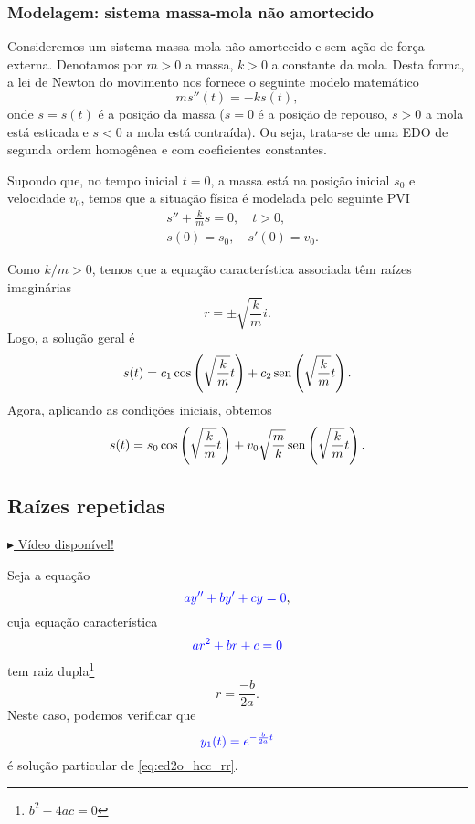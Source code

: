 \subsubsection{Modelagem: sistema massa-mola não amortecido}

Consideremos um sistema massa-mola não amortecido e sem ação de força externa. Denotamos por $m>0$ a massa, $k>0$ a constante da mola. Desta forma, a lei de Newton do movimento nos fornece o seguinte modelo matemático
\begin{equation}
  ms''(t) = -ks(t),
\end{equation}
onde $s = s(t)$ é a posição da massa ($s=0$ é a posição de repouso, $s>0$ a mola está esticada e $s<0$ a mola está contraída). Ou seja, trata-se de uma EDO de segunda ordem homogênea e com coeficientes constantes.

Supondo que, no tempo inicial $t=0$, a massa está na posição inicial $s_0$ e velocidade $v_0$, temos que a situação física é modelada pelo seguinte PVI
\begin{align}
  & s'' + \frac{k}{m}s = 0,\quad t>0,\\
  & s(0) = s_0,\quad s'(0) = v_0.
\end{align}

Como $k/m>0$, temos que a equação característica associada têm raízes imaginárias
\begin{equation}
  r = \pm \sqrt{\frac{k}{m}}i.
\end{equation}
Logo, a solução geral é
\begin{equation}
  s(t) = c_1\cos\left(\sqrt{\frac{k}{m}}t\right) + c_2\operatorname{sen}\left(\sqrt{\frac{k}{m}}t\right).
\end{equation}
Agora, aplicando as condições iniciais, obtemos
\begin{equation}
  s(t) = s_0\cos\left(\sqrt{\frac{k}{m}}t\right) + v_0\sqrt{\frac{m}{k}}\operatorname{sen}\left(\sqrt{\frac{k}{m}}t\right).
\end{equation}

\subsection{Raízes repetidas}

\begin{flushright}
  \href{https://archive.org/details/edo-ordem-2-rrr}{$\blacktriangleright$ Vídeo disponível!}
\end{flushright}


Seja a equação
\begin{equation}\label{eq:ed2o_hcc_rr}
  {\color{blue}ay'' + by' + cy = 0},
\end{equation}
cuja equação característica
\begin{equation}
  {\color{blue}ar^2 + br + c = 0}
\end{equation}
tem raiz dupla\footnote{$b^2-4ac = 0$}
\begin{equation}
  r = \frac{-b}{2a}.
\end{equation}
Neste caso, podemos verificar que
\begin{equation}
  {\color{blue}y_1(t) = e^{-\frac{b}{2a}t}}
\end{equation}
é solução particular de \eqref{eq:ed2o_hcc_rr}.


